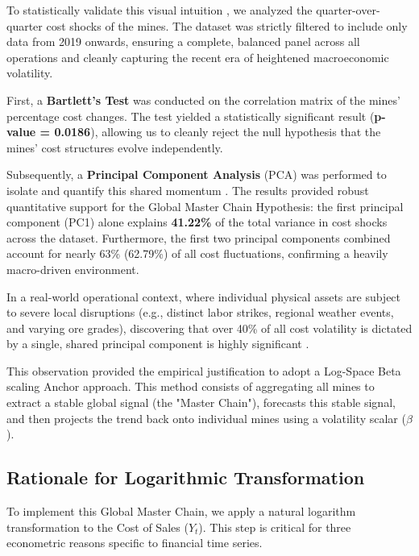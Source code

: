 To statistically validate this visual intuition , we analyzed the quarter-over-quarter cost shocks of the mines. The dataset was strictly filtered to include only data from 2019 onwards, ensuring a complete, balanced panel across all operations and cleanly capturing the recent era of heightened macroeconomic volatility.

First, a \textbf{Bartlett's Test}  was conducted on the correlation matrix of the mines' percentage cost changes. The test yielded a statistically significant result (\textbf{p-value = 0.0186}), allowing us to cleanly reject the null hypothesis that the mines' cost structures evolve independently.

Subsequently, a \textbf{Principal Component Analysis} (PCA) was performed to isolate and quantify this shared momentum . The results provided robust quantitative support for the Global Master Chain Hypothesis: the first principal component (PC1) alone explains \textbf{41.22\% }of the total variance in cost shocks across the dataset. Furthermore, the first two principal components combined account for nearly 63\% (62.79\%) of all cost fluctuations, confirming a heavily macro-driven environment.



In a real-world operational context, where individual physical assets are subject to severe local disruptions (e.g., distinct labor strikes, regional weather events, and varying ore grades), discovering that over 40\% of all cost volatility is dictated by a single, shared principal component is highly significant .

This observation provided the empirical justification to adopt a Log-Space Beta scaling Anchor approach. This method consists of aggregating all mines to extract a stable global signal (the "Master Chain"), forecasts this stable signal, and then projects the trend back onto individual mines using a volatility scalar ($\beta$).

\subsection{Rationale for Logarithmic Transformation}
To implement this Global Master Chain, we apply a natural logarithm transformation to the Cost of Sales ($Y_t$). This step is critical for three econometric reasons specific to financial time series.

